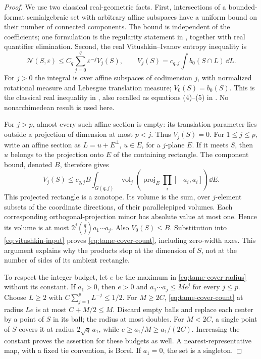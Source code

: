\documentclass[11pt]{amsart}
\theoremstyle{definition}\newtheorem{definition}[theorem]{Definition}
\theoremstyle{remark}\newtheorem{remark}[theorem]{Remark}
\begin{document}
\begin{proof}
We use two classical real-geometric facts. First, intersections of a
bounded-format semialgebraic set with arbitrary affine subspaces have a
uniform bound on their number of connected components. The bound is
independent of the coefficients; one formulation is the regularity
statement in \cite[Lemma 2.18]{ZhangKileel}, together with real quantifier
elimination. Second, the real Vitushkin--Ivanov entropy inequality is
\begin{equation}\label{eq:vitushkin-input}
 \mathcal N(S,\varepsilon)\le C_q\sum_{j=0}^q
       \varepsilon^{-j}V_j(S),\qquad
 V_j(S)=c_{q,j}\int b_0(S\cap L)\,\dd L.
\end{equation}
For $j>0$ the integral is over affine subspaces of codimension $j$,
with normalized rotational measure and Lebesgue translation measure;
$V_0(S)=b_0(S)$. This is the classical real inequality in
\cite[Theorem 3.5]{YomdinComte}, also recalled as equations (4)--(5)
in \cite{ComteHalupczok}. No nonarchimedean result is used here.

For $j>p$, almost every such affine section is empty: its translation
parameter lies outside a projection of dimension at most $p<j$.
Thus $V_j(S)=0$. For $1\le j\le p$, write an affine section as
$L=u+E^\perp$, $u\in E$, for a $j$-plane $E$. If it meets $S$,
then $u$ belongs to the projection onto $E$ of the containing rectangle.
The component bound, denoted $B$, therefore gives
\[
 V_j(S)\le c_{q,j}B
      \int_{G(q,j)}\operatorname{vol}_j
       \left(\operatorname{proj}_E\prod_i[-a_i,a_i]\right)\dd E.
\]
This projected rectangle is a zonotope. Its volume is the sum, over
$j$-element subsets of the coordinate directions, of their parallelepiped
volumes. Each corresponding orthogonal-projection minor has absolute
value at most one. Hence its volume is at most
$2^j\binom qj a_1\cdots a_j$. Also $V_0(S)\le B$.
Substitution into \eqref{eq:vitushkin-input} proves
\eqref{eq:tame-cover-count}, including zero-width axes. This argument
explains why the products stop at the dimension of $S$, not at the
number of sides of its ambient rectangle.

To respect the integer budget, let $e$ be the maximum in
\eqref{eq:tame-cover-radius} without its constant. If $a_1>0$, then
$e>0$ and $a_1\cdots a_j\le Me^j$ for every $j\le p$.
Choose $L\ge2$ with $C\sum_{j=1}^p L^{-j}\le1/2$. For
$M\ge2C$, \eqref{eq:tame-cover-count} at radius $Le$ is at most
$C+M/2\le M$. Discard empty balls and replace each center by a point
of $S$ in its ball; the radius at most doubles. For $M<2C$, a single
point of $S$ covers it at radius $2\sqrt q\,a_1$, while
$e\ge a_1/M\ge a_1/(2C)$. Increasing the constant proves the assertion
for these budgets as well. A nearest-representative map, with a fixed
tie convention, is Borel. If $a_1=0$, the set is a singleton.
\end{proof}
\end{document}
